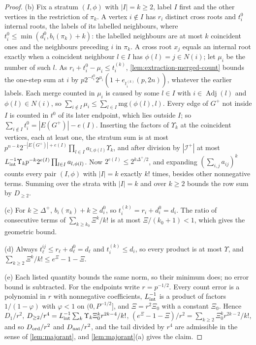 \begin{proof}
(b) Fix a stratum $(I,\phi)$ with $|I|=k\ge2$, label $I$ first and the other vertices
in the restriction of $\pi_k$. A vertex $i\notin I$ has $r_i$ distinct cross roots
and $t^0_i$ internal roots, the labels of its labelled neighbours, where
$t^0_i\le\min(d^0_i,b_i(\pi_k)+k)$: the labelled neighbours are at most $k$
coincident ones and the neighbours preceding $i$ in $\pi_k$. A cross root $x_j$ equals
an internal root exactly when a coincident neighbour $l\in I$ has $\phi(l)=j\in N(i)$;
let $\mu_i$ be the number of such $l$. As $r_i+t^0_i-\mu_i\le t^{(k)}_i$,
\cref{lem:extraction-merged-count} bounds the one-step sum at $i$ by
$p2^{-t^0_i}2^{\mu_i}(1+e_{t^{(k)}_i}(p,2n))$, whatever the earlier labels. Each
merge counted in $\mu_i$ is caused by some $l\in I$ with $i\in\operatorname{Adj}(l)$
and $\phi(l)\in N(i)$, so
$\sum_{i\notin I}\mu_i\le\sum_{l\in I}\mathrm{mg}(\phi(l),l)$. Every edge of $G^+$
not inside $I$ is counted in $t^0$ of its later endpoint, which lies outside $I$;
so $\sum_{i\notin I}t^0_i=|E(G^+)|-e(I)$. Inserting the factors of $\Upsilon_k$ at
the coincident vertices, each at least one, the stratum sum is at most
$p^{n-k}2^{-|E(G^+)|+e(I)}\prod_{l\in I}a_{l,\phi(l)}\Upsilon_k$, and after division by
$|\mathcal I^+|$ at most $L_{\rm int}^{-1}\Upsilon_kp^{-k}2^{e(I)}\prod_{l\in
I}a_{l,\phi(l)}$. Now $2^{e(I)}\le2^{k\Delta^+/2}$, and expanding
$(\sum_{i,j}a_{ij})^k$ counts every pair $(I,\phi)$ with $|I|=k$ exactly $k!$ times,
besides other nonnegative terms. Summing over the strata with $|I|=k$ and over
$k\ge2$ bounds the row sum by $D_{\ge2}$.

(c) For $k\ge\Delta^+$, $b_i(\pi_k)+k\ge d^0_i$, so $t^{(k)}_i=r_i+d^0_i=d_i$. The
ratio of consecutive terms of $\sum_{k\ge k_0}\Xi^k/k!$ is at most $\Xi/(k_0+1)<1$,
which gives the geometric bound.

(d) Always $t^{ij}_\ell\le r_\ell+d^0_\ell=d_\ell$ and $t^{(k)}_i\le d_i$, so every
product is at most $\Upsilon$, and $\sum_{k\ge2}\Xi^k/k!\le e^\Xi-1-\Xi$.

(e) Each listed quantity bounds the same norm, so their minimum does; no error
bound is subtracted. For the endpoints write $r=p^{-1/2}$. Every count error is a
polynomial in $r$ with nonnegative coefficients, $L_{\rm int}^{-1}$ is a product of
factors $1/(1-\varphi)$ with $\varphi<1$ on $(0,P^{-1/2}]$, and $\Xi=r^2\Xi_0$ with a
constant $\Xi_0$. Hence $D_1/r^2$, $D_{\ge2}/r^4=L_{\rm int}^{-1}\sum_k\Upsilon_k\Xi_0^k
r^{2k-4}/k!$, $(e^\Xi-1-\Xi)/r^2=\sum_{k\ge2}\Xi_0^kr^{2k-2}/k!$, and so
$D_{\rm ord}/r^2$ and $D_{\rm nat}/r^2$, and the tail divided by $r^4$ are admissible
in the sense of \cref{lem:majorant}, and \cref{lem:majorant}(a) gives the claim.
\end{proof}

